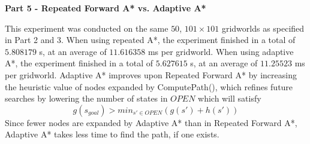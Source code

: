 \documentclass[11pt]{article}
\begin{document}
    \begin{center}
        \Large
        \textbf{Part 5 - Repeated Forward A* vs. Adaptive A*}
    \end{center}
    \normalsize
    This experiment was conducted on the same $50$, $101 \times 101$ gridworlds as specified in Part 2 and 3.
    When using repeated A*, the experiment finished in a total of $5.808179$ s, at an average of $11.616358$ ms per gridworld.
    When using adaptive A*, the experiment finished in a total of $5.627615$ s, at an average of $11.25523$ ms per gridworld.
    \newline\newline
    Adaptive A* improves upon Repeated Forward A* by increasing the heuristic value of nodes expanded by ComputePath(), which refines
    future searches by lowering the number of states in $OPEN$ which will satisfy \[g(s_{goal}) > min_{s'\in OPEN}\left(g(s') + h(s')\right)\]
    Since fewer nodes are expanded by Adaptive A* than in Repeated Forward A*, Adaptive A* takes less time to find the path, if one exists.
\end{document}
